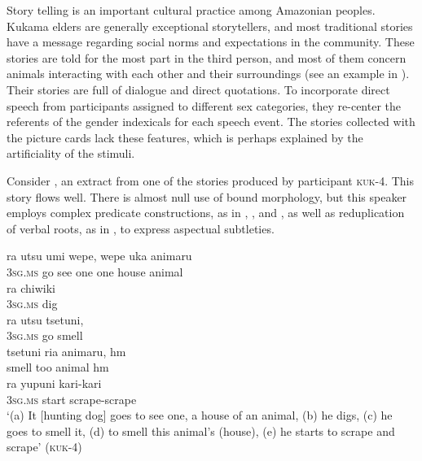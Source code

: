 \documentclass[output=paper]{langscibook}
\begin{document}
\begin{sloppypar}
Story telling is an important cultural practice among Amazonian peoples. Kukama elders are generally exceptional storytellers, and most traditional stories have a message regarding social norms and expectations in the community. These stories are told for the most part in the third person, and most of them concern animals interacting with each other and their surroundings (see an example in \citealt{Vallejos2018}). Their stories are full of dialogue and direct quotations. To incorporate direct speech from participants assigned to different sex categories, they re-center the referents of the gender indexicals for each speech event. The stories collected with the picture cards lack these features, which is perhaps explained by the artificiality of the stimuli.
\end{sloppypar}

Consider , an extract from one of the stories produced by participant \textsc{kuk}{}-4. This story flows well. There is almost null use of bound morphology, but this speaker employs complex predicate constructions, as in , , and , as well as reduplication of verbal roots, as in , to express aspectual subtleties.


\ea\label{ex:7:3}
\ea\label{ex:7:3a}
\gll ra     utsu   umi   wepe,   wepe   uka   animaru\\
      \textsc{3sg.ms}  go  see  one  one   house  animal\\

\ex\label{ex:7:3b}
\gll ra     chiwiki\\
    \textsc{3sg.ms}  dig\\

\ex\label{ex:7:3c}
\gll ra     utsu   tsetuni,\\
    \textsc{3sg.ms}  go  smell\\

\ex\label{ex:7:3d}
\gll tsetuni   ria   animaru,   hm\\
    smell  too  animal    hm\\

\ex\label{ex:7:3e}
\gll ra     yupuni kari-kari\\
    \textsc{3sg.ms}  start   scrape-scrape\\
\glt ‘(a) It [hunting dog] goes to see one, a house of an animal, (b) he digs, (c) he goes to smell it, (d) to smell this animal’s (house), (e) he starts to scrape and scrape’ (\textsc{kuk}{}-4)
\z
\z
\end{document}
